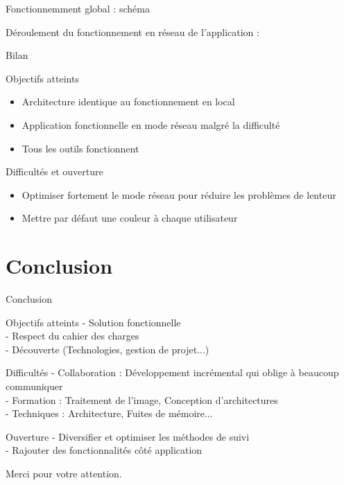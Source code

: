 \documentclass{beamer}
\begin{document}
		\begin{frame}{Fonctionnemment global : schéma}
		
		Déroulement du fonctionnement en réseau de l'application :
			\begin{center}
			\scalebox{0.5}{} 
			\end{center}
		\end{frame}
		
		\begin{frame}{Bilan}
			\begin{exampleblock}{Objectifs atteints}
				\begin{itemize}
				\item Architecture identique au fonctionnement en local
				\item Application fonctionnelle en mode réseau malgré la difficulté
				\item Tous les outils fonctionnent
				\end{itemize}
			\end{exampleblock}
			\pause
			\begin{alertblock}{Difficultés et ouverture}
				\begin{itemize}
				\item Optimiser fortement le mode réseau pour réduire les problèmes de lenteur
				\item Mettre par défaut une couleur à chaque utilisateur
				\end{itemize}
			\end{alertblock}
		\end{frame}

	\section{Conclusion}
		\begin{frame}{Conclusion}
			\begin{exampleblock}{Objectifs atteints}
				- Solution fonctionnelle \\
				- Respect du cahier des charges \\
				- Découverte (Technologies, gestion de projet...) \\ 
			\end{exampleblock}
			\pause
			\begin{alertblock}{Difficultés}
				- Collaboration : Développement incrémental qui oblige à beaucoup communiquer \\
				- Formation : Traitement de l'image, Conception d'architectures \\
				- Techniques : Architecture, Fuites de mémoire...\\
			\end{alertblock}
			\pause
			\begin{block}{Ouverture}
				- Diversifier et optimiser les méthodes de suivi \\
				- Rajouter des fonctionnalités côté application \\
			\end{block}
		\end{frame}
	
	\begin{frame}
		\begin{center}
			\huge{Merci pour votre attention.} \\
		\end{center}
	\end{frame}
\end{document}
